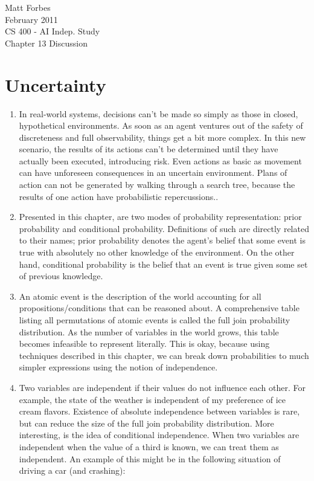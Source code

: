 \documentclass[a4paper,12pt]{article}
\begin{document}
Matt Forbes \\
February 2011 \\
CS 400 - AI Indep. Study \\
Chapter 13 Discussion

\section*{Uncertainty}
\begin{enumerate}[]
  
  \item In real-world systems, decisions can't be made so simply as
    those in closed, hypothetical environments. As soon as an agent
    ventures out of the safety of discreteness and full observability,
    things get a bit more complex. In this new scenario, the results
    of its actions can't be determined until they have actually been
    executed, introducing risk. Even actions as basic as movement can
    have unforeseen consequences in an uncertain environment. Plans of
    action can not be generated by walking through a search tree,
    because the results of one action have probabilistic
    repercussions..
    
  \item Presented in this chapter, are two modes of probability
    representation: prior probability and conditional
    probability. Definitions of such are directly related to their
    names; prior probability denotes the agent's belief that some
    event is true with absolutely no other knowledge of the
    environment. On the other hand, conditional probability is the
    belief that an event is true given some set of previous knowledge.

  \item An atomic event is the description of the world accounting for
    all propositions/conditions that can be reasoned about. A
    comprehensive table listing all permutations of atomic events is
    called the full join probability distribution. As the number of
    variables in the world grows, this table becomes infeasible to
    represent literally. This is okay, because using techniques
    described in this chapter, we can break down probabilities to much
    simpler expressions using the notion of independence.

  \item Two variables are independent if their values do not influence
    each other. For example, the state of the weather is independent
    of my preference of ice cream flavors. Existence of absolute
    independence between variables is rare, but can reduce the size of
    the full join probability distribution. More interesting, is the
    idea of conditional independence. When two variables are
    independent when the value of a third is known, we can treat them
    as independent. An example of this might be in the following
    situation of driving a car (and crashing): 


\end{enumerate}
\end{document}
